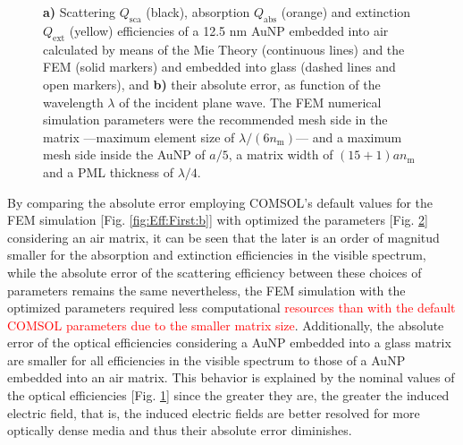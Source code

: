\begin{figure}[h!]
 \def\svgwidth{.9\textwidth}
 \small
 \centering
    \hspace*{-.95\textwidth}
     \begin{subfigure}{\textwidth}\caption{}\label{fig:Eff:Conv:a}\end{subfigure}\\[11.5em]
    \hspace*{-.95\textwidth}
     \begin{subfigure}{\textwidth}\caption{}\label{fig:Eff:Conv:b}\end{subfigure}\\[-15em]
\caption[Scattering, Absorption and Extinction Efficiencies of a 12.5 nm AuNP$@$Air: Analytical and FEM solutions with optimized parameters for a FEM simulation]{\textbf{a)} Scattering $Q_\text{sca}$ (black), absorption $Q_\text{abs}$ (orange) and extinction $Q_\text{ext}$ (yellow) efficiencies of a 12.5 nm AuNP embedded into air calculated by means of the Mie Theory (continuous lines) and the FEM (solid markers) and embedded into glass (dashed lines and open markers), and \textbf{b)} their absolute error, as function of the wavelength $\lambda$ of the incident plane wave. The FEM numerical simulation parameters were the recommended mesh side in the matrix ---maximum element size of $\lambda/(6n_\text{m})$--- and a maximum mesh side inside the AuNP of $a/5$, a matrix width of $(15+1) a n_\text{m}$ and a PML thickness of $\lambda/4$.}
\label{fig:Eff:Conv}
\end{figure}

By comparing the absolute error employing COMSOL's default values for the FEM simulation [Fig. \ref{fig:Eff:First:b}] with optimized the parameters [Fig. \ref{fig:Eff:Conv:b}] considering an air matrix, it can be seen that the later is an order of magnitud smaller for the absorption and extinction efficiencies in the visible spectrum, while the absolute error of the scattering efficiency between these choices of parameters remains the same nevertheless, the FEM simulation with the optimized parameters required less computational \textcolor{red}{resources than with the default COMSOL parameters due to the smaller matrix size}. Additionally, the absolute error of the optical efficiencies considering a AuNP embedded into a glass matrix are smaller for all efficiencies in the visible spectrum to those of a AuNP embedded into an air matrix. This behavior is explained by the nominal values of the optical efficiencies [Fig. \ref{fig:Eff:Conv:a}] since the greater they are, the greater the induced electric field, that is, the induced electric fields are better resolved for more optically dense media and thus their absolute error diminishes.
